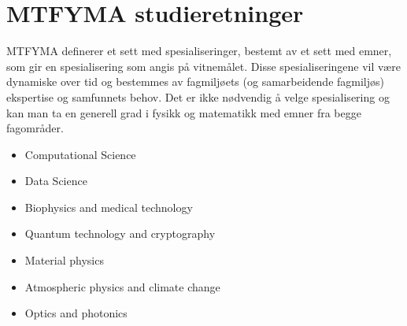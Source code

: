\chapter{MTFYMA studieretninger}
\label{c:mtfyma-spec}

MTFYMA definerer et sett med spesialiseringer, bestemt av et sett med emner, som gir en spesialisering som angis på vitnemålet. Disse spesialiseringene vil være dynamiske over tid og bestemmes av fagmiljøets (og samarbeidende fagmiljøs) ekspertise og samfunnets behov. Det er ikke nødvendig å velge spesialisering og kan man ta en generell grad i fysikk og matematikk med emner fra begge fagområder.

\begin{itemize}
	\item Computational Science
	\item Data Science
	\item Biophysics and medical technology
	\item Quantum technology and cryptography
	\item Material physics
	\item Atmospheric physics and climate change
	\item Optics and photonics
\end{itemize}
